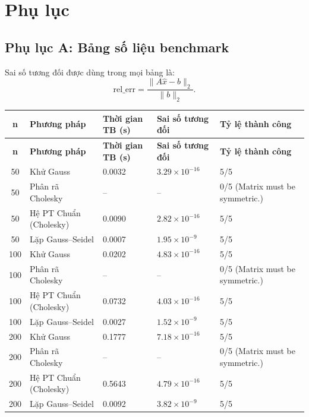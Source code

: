 \documentclass[a4paper]{article}
\begin{document}
\section*{Phụ lục}

\subsection*{Phụ lục A: Bảng số liệu benchmark}

Sai số tương đối được dùng trong mọi bảng là:
\[
\text{rel\_err} = \frac{\|A\hat{x}-b\|_2}{\|b\|_2}.
\]

\begingroup
\scriptsize
\setlength{\tabcolsep}{4pt}
\renewcommand{\arraystretch}{1.15}
\begin{longtable}{|c|p{}|p{}|p{}|p{}|}
\hline
\textbf{n} & \textbf{Phương pháp} & \textbf{Thời gian TB (s)} & \textbf{Sai số tương đối} & \textbf{Tỷ lệ thành công} \\ \hline
\endfirsthead
\hline
\textbf{n} & \textbf{Phương pháp} & \textbf{Thời gian TB (s)} & \textbf{Sai số tương đối} & \textbf{Tỷ lệ thành công} \\ \hline
\endhead
50 & Khử Gauss & 0.0032 & $3.29\times 10^{-16}$ & 5/5 \\ \hline
50 & Phân rã Cholesky & -- & -- & 0/5 (Matrix must be symmetric.) \\ \hline
50 & Hệ PT Chuẩn (Cholesky) & 0.0090 & $2.82\times 10^{-16}$ & 5/5 \\ \hline
50 & Lặp Gauss--Seidel & 0.0007 & $1.95\times 10^{-9}$ & 5/5 \\ \hline
100 & Khử Gauss & 0.0202 & $4.83\times 10^{-16}$ & 5/5 \\ \hline
100 & Phân rã Cholesky & -- & -- & 0/5 (Matrix must be symmetric.) \\ \hline
100 & Hệ PT Chuẩn (Cholesky) & 0.0732 & $4.03\times 10^{-16}$ & 5/5 \\ \hline
100 & Lặp Gauss--Seidel & 0.0027 & $1.52\times 10^{-9}$ & 5/5 \\ \hline
200 & Khử Gauss & 0.1777 & $7.18\times 10^{-16}$ & 5/5 \\ \hline
200 & Phân rã Cholesky & -- & -- & 0/5 (Matrix must be symmetric.) \\ \hline
200 & Hệ PT Chuẩn (Cholesky) & 0.5643 & $4.79\times 10^{-16}$ & 5/5 \\ \hline
200 & Lặp Gauss--Seidel & 0.0092 & $3.82\times 10^{-9}$ & 5/5 \\ \hline

\end{longtable}
\end{document}
